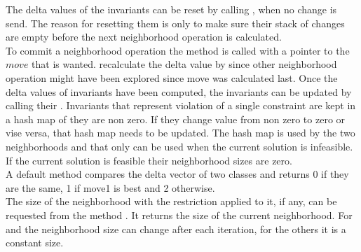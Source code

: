 The delta values of the invariants can be reset by calling , when no change is send. The 
reason for resetting them is only to make sure their stack of changes are empty before the next neighborhood operation 
is calculated. \\ 
To commit a neighborhood operation the method  is called with a pointer to the 
 $move$ that is wanted.  recalculate the delta value 
by  since other neighborhood operation might have been explored since move was 
calculated last. Once the delta values of invariants have been computed, the invariants can be updated by calling their 
. Invariants that represent violation of a single constraint are kept in a hash map of they are 
non zero. If they change value from non zero to zero or vise versa, that hash map needs to be updated. The hash map is 
used by the two neighborhoods  and  that only can be used when the 
current solution is infeasible. If the current solution is feasible their neighborhood sizes are zero. \\
A default method  compares the delta vector of two  classes and 
returns 0 if they are the same, 1 if move1 is best and 2 otherwise. \\ 
The size of the neighborhood with the restriction applied to it, if any, can be requested from the 
method . It returns the size of the current neighborhood. For  and 
 the neighborhood size can change after each iteration, for the others it is a constant 
size. \\ 


